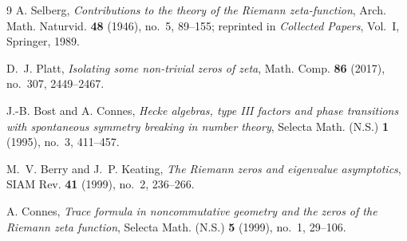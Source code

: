 \documentclass[11pt]{article}
\theoremstyle{plain}
\theoremstyle{definition}
\theoremstyle{remark}
\begin{document}
\begin{thebibliography}{9}
A. Selberg,
\emph{Contributions to the theory of the Riemann zeta-function},
Arch. Math. Naturvid. \textbf{48} (1946), no.~5, 89--155;
reprinted in \emph{Collected Papers}, Vol.~I, Springer, 1989.

D.~J. Platt,
\emph{Isolating some non-trivial zeros of zeta},
Math. Comp. \textbf{86} (2017), no.~307, 2449--2467.

J.-B. Bost and A. Connes,
\emph{Hecke algebras, type III factors and phase transitions with spontaneous symmetry
breaking in number theory},
Selecta Math. (N.S.) \textbf{1} (1995), no.~3, 411--457.

M.~V. Berry and J.~P. Keating,
\emph{The Riemann zeros and eigenvalue asymptotics},
SIAM Rev. \textbf{41} (1999), no.~2, 236--266.

A. Connes,
\emph{Trace formula in noncommutative geometry and the zeros of the Riemann zeta
function},
Selecta Math. (N.S.) \textbf{5} (1999), no.~1, 29--106.

\end{thebibliography}
\end{document}
